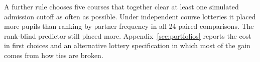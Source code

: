 A further rule chooses five courses that together clear at least one simulated admission cutoff as often as possible. Under independent course lotteries it placed more pupils than ranking by partner frequency in all 24 paired comparisons. The rank-blind predictor still placed more. Appendix~\ref{sec:portfolios} reports the cost in first choices and an alternative lottery specification in which most of the gain comes from how ties are broken.
